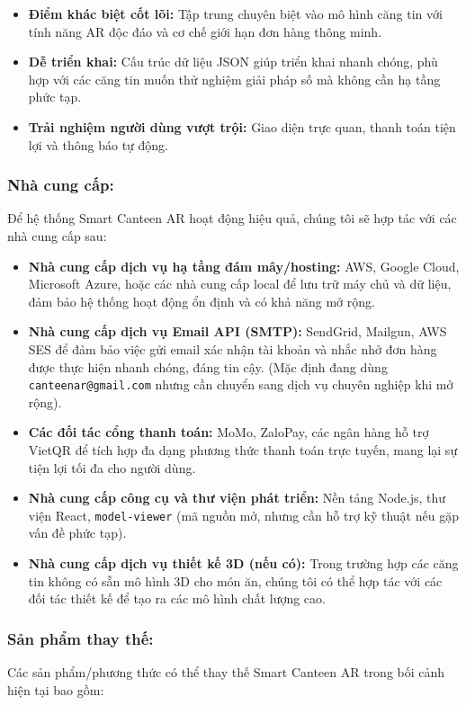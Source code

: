 \documentclass[12pt,a4paper]{article}
\begin{document}
\begin{itemize}[label=\textbullet]
    \item \textbf{Điểm khác biệt cốt lõi:} Tập trung chuyên biệt vào mô hình căng tin với tính năng AR độc đáo và cơ chế giới hạn đơn hàng thông minh.
    \item \textbf{Dễ triển khai:} Cấu trúc dữ liệu JSON giúp triển khai nhanh chóng, phù hợp với các căng tin muốn thử nghiệm giải pháp số mà không cần hạ tầng phức tạp.
    \item \textbf{Trải nghiệm người dùng vượt trội:} Giao diện trực quan, thanh toán tiện lợi và thông báo tự động.
\end{itemize}

\subsubsection{Nhà cung cấp:}
Để hệ thống Smart Canteen AR hoạt động hiệu quả, chúng tôi sẽ hợp tác với các nhà cung cấp sau:

\begin{itemize}[label=\textbullet]
    \item \textbf{Nhà cung cấp dịch vụ hạ tầng đám mây/hosting:} AWS, Google Cloud, Microsoft Azure, hoặc các nhà cung cấp local để lưu trữ máy chủ và dữ liệu, đảm bảo hệ thống hoạt động ổn định và có khả năng mở rộng.
    \item \textbf{Nhà cung cấp dịch vụ Email API (SMTP):} SendGrid, Mailgun, AWS SES để đảm bảo việc gửi email xác nhận tài khoản và nhắc nhở đơn hàng được thực hiện nhanh chóng, đáng tin cậy. (Mặc định đang dùng \texttt{canteenar@gmail.com} nhưng cần chuyển sang dịch vụ chuyên nghiệp khi mở rộng).
    \item \textbf{Các đối tác cổng thanh toán:} MoMo, ZaloPay, các ngân hàng hỗ trợ VietQR để tích hợp đa dạng phương thức thanh toán trực tuyến, mang lại sự tiện lợi tối đa cho người dùng.
    \item \textbf{Nhà cung cấp công cụ và thư viện phát triển:} Nền tảng Node.js, thư viện React, \texttt{model-viewer} (mã nguồn mở, nhưng cần hỗ trợ kỹ thuật nếu gặp vấn đề phức tạp).
    \item \textbf{Nhà cung cấp dịch vụ thiết kế 3D (nếu có):} Trong trường hợp các căng tin không có sẵn mô hình 3D cho món ăn, chúng tôi có thể hợp tác với các đối tác thiết kế để tạo ra các mô hình chất lượng cao.
\end{itemize}

\subsubsection{Sản phẩm thay thế:}
Các sản phẩm/phương thức có thể thay thế Smart Canteen AR trong bối cảnh hiện tại bao gồm:
\end{document}
